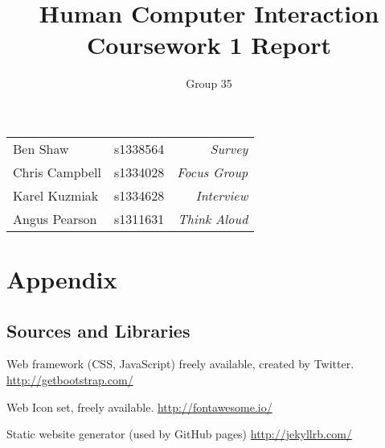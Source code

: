 \documentclass[a4paper, notoc]{tufte-handout}
\title{Human Computer Interaction\\ Coursework 1 Report}
\author{Group 35}
\let\origdescription\description
\renewenvironment{description}{
  \setlength{\leftmargini}{0em}
  \origdescription
  \setlength{\itemindent}{0em}
  \setlength{\labelsep}{\textwidth}
}
{\endlist}
\begin{document}
\maketitle %
\vspace{1em}
\noindent
\begin{tabular}{l l r}
  Ben Shaw       & s1338564 & \textit{Survey}\\
  Chris Campbell & s1334028 & \textit{Focus Group}\\
  Karel Kuzmiak  & s1334628 & \textit{Interview}\\
  Angus Pearson  & s1311631 & \textit{Think Aloud}\\
\end{tabular}

\tableofcontents
\newpage

%







\newpage
\section*{\textbf{Appendix}}

\subsection*{Sources and Libraries}

\begin{description}

\item[BootStrap]
Web framework (CSS, JavaScript) freely available, created by Twitter.
\href{http://getbootstrap.com/}{http://getbootstrap.com/}

\item[FontAwesome]
Web Icon set, freely available.
\href{http://fontawesome.io/}{http://fontawesome.io/}

\item[Jekyll]
Static website generator (used by GitHub pages)
\href{http://jekyllrb.com/}{http://jekyllrb.com/}


\end{description}

%
%
\end{document}
